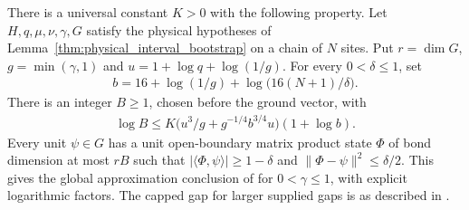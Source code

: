 \begin{theorem}
    \label{thm:physical_dg_normalized_mps_approximation}
    \leanok
    There is a universal constant $K>0$ with the following property.
    Let $H,q,\mu,\nu,\gamma,G$ satisfy the physical hypotheses of
    Lemma~\ref{thm:physical_interval_bootstrap} on a chain of $N$ sites.
    Put $r=\dim G$, $g=\min(\gamma,1)$ and $u=1+\log q+\log(1/g)$.
    For every $0<\delta\le1$, set
    \begin{align}
        b=16+\log(1/g)+\log\bigl(16(N+1)/\delta\bigr).
        \label{eq:physical_global_accuracy}
    \end{align}
    There is an integer $B\ge1$, chosen before the ground vector, with
    \begin{align}
        \log B\le K\bigl(u^3/g+g^{-1/4}b^{3/4}u\bigr)(1+\log b).
        \label{eq:physical_global_bond}
    \end{align}
    Every unit $\psi\in G$ has a unit open-boundary matrix product state
    $\Phi$ of bond dimension at most $rB$ such that
    $|\langle\Phi,\psi\rangle|\ge1-\delta$ and
    $\|\Phi-\psi\|^2\le\delta/2$.
    This gives the global approximation conclusion of
    \cite[Theorem~4.9]{Arad2016RigorousRG} for $0<\gamma\le1$, with
    explicit logarithmic factors. The capped gap for larger supplied gaps
    is as described in \cite{gap:alvv16_approximation_parameters}.
\end{theorem}
